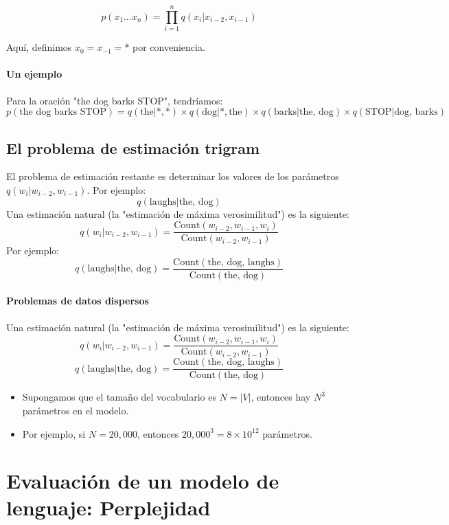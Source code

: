 \[
p(x_1 \ldots x_n) = \prod_{i=1}^{n} q(x_i|x_{i-2}, x_{i-1})
\]

Aquí, definimos $x_0 = x_{-1} = *$ por conveniencia.

\paragraph{Un ejemplo}

Para la oración "the dog barks STOP", tendríamos:
\[
p(\text{the dog barks STOP}) = q(\text{the}|*, *) \times q(\text{dog}|*, \text{the}) \times q(\text{barks}|\text{the, dog}) \times q(\text{STOP}|\text{dog, barks})
\]

\subsection{El problema de estimación trigram}

El problema de estimación restante es determinar los valores de los parámetros $q(w_i | w_{i-2}, w_{i-1})$. Por ejemplo:
\[
q(\text{laughs} | \text{the, dog})
\]
Una estimación natural (la "estimación de máxima verosimilitud") es la siguiente:
\[
q(w_i | w_{i-2}, w_{i-1}) = \frac{{\text{Count}(w_{i-2}, w_{i-1}, w_i)}}{{\text{Count}(w_{i-2}, w_{i-1})}}
\]
Por ejemplo:
\[
q(\text{laughs} | \text{the, dog}) = \frac{{\text{Count}(\text{the, dog, laughs})}}{{\text{Count}(\text{the, dog})}}
\]

\paragraph{Problemas de datos dispersos}

Una estimación natural (la "estimación de máxima verosimilitud") es la siguiente:
\[
q(w_i | w_{i-2}, w_{i-1}) = \frac{{\text{Count}(w_{i-2}, w_{i-1}, w_i)}}{{\text{Count}(w_{i-2}, w_{i-1})}}
\]
\[
q(\text{laughs} | \text{the, dog}) = \frac{{\text{Count}(\text{the, dog, laughs})}}{{\text{Count}(\text{the, dog})}}
\]
\begin{itemize}
    \item Supongamos que el tamaño del vocabulario es $N = |V|$, entonces hay $N^3$ parámetros en el modelo.
    \item Por ejemplo, si $N = 20,000$, entonces $20,000^3 = 8 \times 10^{12}$ parámetros.
\end{itemize}

\section{Evaluación de un modelo de lenguaje: Perplejidad}

